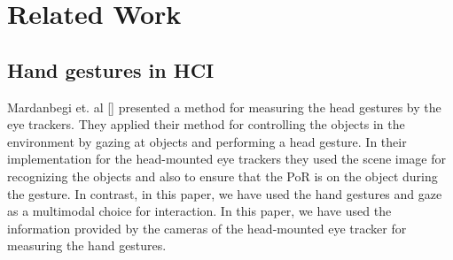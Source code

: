 \documentclass[jou,a4paper,notxfonts]{apa}
\begin{document}




\section{Related Work}


\subsection{Hand gestures in HCI}
%


Mardanbegi et. al [] presented a method for measuring the head gestures by the eye trackers. They applied their method
for controlling the objects in the environment by gazing at objects and performing a head gesture. In their
implementation for the head-mounted eye trackers they used the scene image for recognizing the objects and also to
ensure that the PoR is on the object during the gesture. In contrast, in this paper, we have used the hand gestures and
gaze as a multimodal choice for interaction. In this paper, we have used the information provided by the cameras of the
head-mounted eye tracker for measuring the hand gestures.
\end{document}
